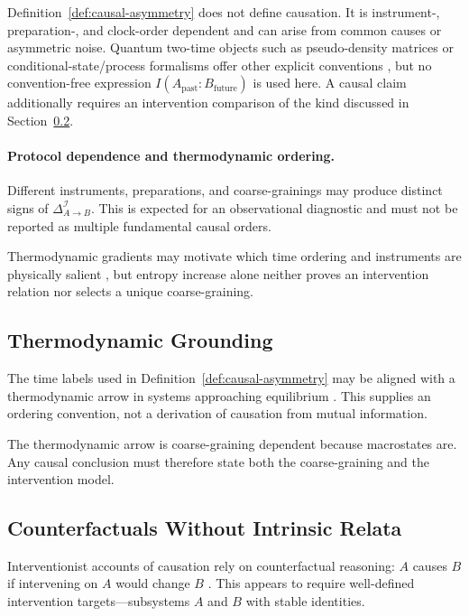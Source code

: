 \documentclass[11pt,a4paper]{article}
\begin{document}
Definition~\ref{def:causal-asymmetry} does not define causation.  It is instrument-, preparation-, and clock-order dependent and can arise from common causes or asymmetric noise.  Quantum two-time objects such as pseudo-density matrices or conditional-state/process formalisms offer other explicit conventions \cite{Fitzsimons2015,LeiferSpekkens2013}, but no convention-free expression $I(A_{\mathrm{past}}:B_{\mathrm{future}})$ is used here.  A causal claim additionally requires an intervention comparison of the kind discussed in Section~\ref{sec:I.4}.

\paragraph{Protocol dependence and thermodynamic ordering.}
Different instruments, preparations, and coarse-grainings may produce distinct signs of $\Delta_{A\to B}^{\mathcal I}$.  This is expected for an observational diagnostic and must not be reported as multiple fundamental causal orders.

Thermodynamic gradients may motivate which time ordering and instruments are physically salient \cite{Wallace2012Time}, but entropy increase alone neither proves an intervention relation nor selects a unique coarse-graining.

\subsection{Thermodynamic Grounding}
\label{sec:I.3}

The time labels used in Definition~\ref{def:causal-asymmetry} may be aligned with a thermodynamic arrow in systems approaching equilibrium \cite{Wallace2012Time}.  This supplies an ordering convention, not a derivation of causation from mutual information.

The thermodynamic arrow is coarse-graining dependent because macrostates are.  Any causal conclusion must therefore state both the coarse-graining and the intervention model.

\subsection{Counterfactuals Without Intrinsic Relata}
\label{sec:I.4}

Interventionist accounts of causation rely on counterfactual reasoning: $A$ causes $B$ if intervening on $A$ would change $B$ \cite{Woodward2003}. This appears to require well-defined intervention targets—subsystems $A$ and $B$ with stable identities.
\end{document}
